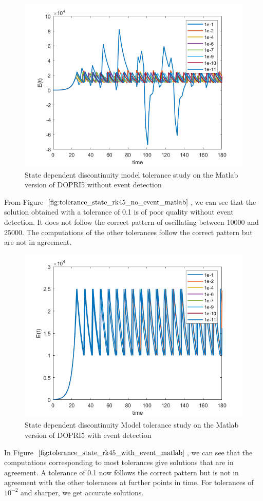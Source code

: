 \begin{figure}[h]
\centering
\includegraphics[width=0.7\linewidth]{./figures/tolerance_state_rk45_no_event_matlab}
\caption{State dependent discontinuity model tolerance study on the Matlab version of DOPRI5 without event detection}
\label{fig:tolerance_state_rk45_no_event_matlab}
\end{figure}

From Figure $\ref{fig:tolerance_state_rk45_no_event_matlab}$, we can see that the solution obtained with a tolerance of 0.1 is of poor quality without event detection. It does not follow the correct pattern of oscillating between 10000 and 25000. The computations of the other tolerances follow the correct pattern but are not in agreement.

\begin{figure}[h]
\centering
\includegraphics[width=0.7\linewidth]{./figures/tolerance_state_rk45_with_event_matlab}
\caption{State dependent discontinuity Model tolerance study on the Matlab version of DOPRI5 with event detection}
\label{fig:tolerance_state_rk45_with_event_matlab}
\end{figure}
In Figure $\ref{fig:tolerance_state_rk45_with_event_matlab}$, we can see that the computations corresponding to most tolerances give solutions that are in agreement. A tolerance of 0.1 now follows the correct pattern but is not in agreement with the other tolerances at further points in time. For tolerances of $10^{-2}$ and sharper, we get accurate solutions.

